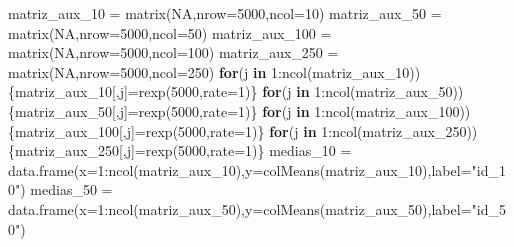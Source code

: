 \documentclass[
]{book}
\newenvironment{Shaded}{\begin{snugshade}}{\end{snugshade}}
\newcommand{\AttributeTok}[1]{\textcolor[rgb]{0.77,0.63,0.00}{#1}}
\newcommand{\ConstantTok}[1]{\textcolor[rgb]{0.00,0.00,0.00}{#1}}
\newcommand{\ControlFlowTok}[1]{\textcolor[rgb]{0.13,0.29,0.53}{\textbf{#1}}}
\newcommand{\DecValTok}[1]{\textcolor[rgb]{0.00,0.00,0.81}{#1}}
\newcommand{\FunctionTok}[1]{\textcolor[rgb]{0.00,0.00,0.00}{#1}}
\newcommand{\NormalTok}[1]{#1}
\newcommand{\OtherTok}[1]{\textcolor[rgb]{0.56,0.35,0.01}{#1}}
\newcommand{\SpecialCharTok}[1]{\textcolor[rgb]{0.00,0.00,0.00}{#1}}
\newcommand{\StringTok}[1]{\textcolor[rgb]{0.31,0.60,0.02}{#1}}
\begin{document}
\begin{Shaded}
\begin{Highlighting}[]
\NormalTok{matriz\_aux\_10 }\OtherTok{=} \FunctionTok{matrix}\NormalTok{(}\ConstantTok{NA}\NormalTok{,}\AttributeTok{nrow=}\DecValTok{5000}\NormalTok{,}\AttributeTok{ncol=}\DecValTok{10}\NormalTok{)}
\NormalTok{matriz\_aux\_50 }\OtherTok{=} \FunctionTok{matrix}\NormalTok{(}\ConstantTok{NA}\NormalTok{,}\AttributeTok{nrow=}\DecValTok{5000}\NormalTok{,}\AttributeTok{ncol=}\DecValTok{50}\NormalTok{)}
\NormalTok{matriz\_aux\_100 }\OtherTok{=} \FunctionTok{matrix}\NormalTok{(}\ConstantTok{NA}\NormalTok{,}\AttributeTok{nrow=}\DecValTok{5000}\NormalTok{,}\AttributeTok{ncol=}\DecValTok{100}\NormalTok{)}
\NormalTok{matriz\_aux\_250 }\OtherTok{=} \FunctionTok{matrix}\NormalTok{(}\ConstantTok{NA}\NormalTok{,}\AttributeTok{nrow=}\DecValTok{5000}\NormalTok{,}\AttributeTok{ncol=}\DecValTok{250}\NormalTok{)}
\ControlFlowTok{for}\NormalTok{(j }\ControlFlowTok{in} \DecValTok{1}\SpecialCharTok{:}\FunctionTok{ncol}\NormalTok{(matriz\_aux\_10))\{matriz\_aux\_10[,j]}\OtherTok{=}\FunctionTok{rexp}\NormalTok{(}\DecValTok{5000}\NormalTok{,}\AttributeTok{rate=}\DecValTok{1}\NormalTok{)\}}
\ControlFlowTok{for}\NormalTok{(j }\ControlFlowTok{in} \DecValTok{1}\SpecialCharTok{:}\FunctionTok{ncol}\NormalTok{(matriz\_aux\_50))\{matriz\_aux\_50[,j]}\OtherTok{=}\FunctionTok{rexp}\NormalTok{(}\DecValTok{5000}\NormalTok{,}\AttributeTok{rate=}\DecValTok{1}\NormalTok{)\}}
\ControlFlowTok{for}\NormalTok{(j }\ControlFlowTok{in} \DecValTok{1}\SpecialCharTok{:}\FunctionTok{ncol}\NormalTok{(matriz\_aux\_100))\{matriz\_aux\_100[,j]}\OtherTok{=}\FunctionTok{rexp}\NormalTok{(}\DecValTok{5000}\NormalTok{,}\AttributeTok{rate=}\DecValTok{1}\NormalTok{)\}}
\ControlFlowTok{for}\NormalTok{(j }\ControlFlowTok{in} \DecValTok{1}\SpecialCharTok{:}\FunctionTok{ncol}\NormalTok{(matriz\_aux\_250))\{matriz\_aux\_250[,j]}\OtherTok{=}\FunctionTok{rexp}\NormalTok{(}\DecValTok{5000}\NormalTok{,}\AttributeTok{rate=}\DecValTok{1}\NormalTok{)\}}
\NormalTok{medias\_10 }\OtherTok{=} \FunctionTok{data.frame}\NormalTok{(}\AttributeTok{x=}\DecValTok{1}\SpecialCharTok{:}\FunctionTok{ncol}\NormalTok{(matriz\_aux\_10),}\AttributeTok{y=}\FunctionTok{colMeans}\NormalTok{(matriz\_aux\_10),}\AttributeTok{label=}\StringTok{"id\_10"}\NormalTok{)}
\NormalTok{medias\_50 }\OtherTok{=} \FunctionTok{data.frame}\NormalTok{(}\AttributeTok{x=}\DecValTok{1}\SpecialCharTok{:}\FunctionTok{ncol}\NormalTok{(matriz\_aux\_50),}\AttributeTok{y=}\FunctionTok{colMeans}\NormalTok{(matriz\_aux\_50),}\AttributeTok{label=}\StringTok{"id\_50"}\NormalTok{)}

\end{Highlighting}
\end{Shaded}
\end{document}
